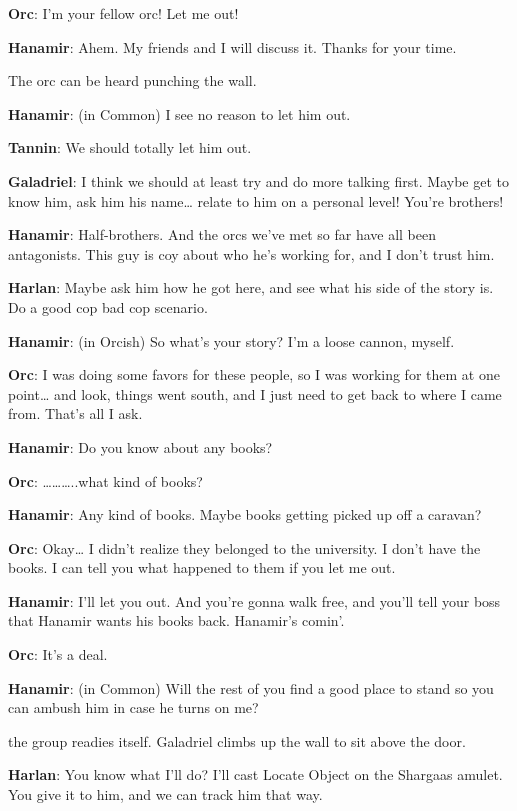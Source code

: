 \documentclass[smalldemyvopaper,11pt,twoside,onecolumn,openright,extrafontsizes]{memoir}
\begin{document}
\textbf{Orc}: I'm your fellow orc! Let me out!

\textbf{Hanamir}: Ahem. My friends and I will discuss it. Thanks for
your time.

The orc can be heard punching the wall.

\textbf{Hanamir}: (in Common) I see no reason to let him out.

\textbf{Tannin}: We should totally let him out.

\textbf{Galadriel}: I think we should at least try and do more talking
first. Maybe get to know him, ask him his name\ldots{} relate to him on
a personal level! You're brothers!

\textbf{Hanamir}: Half-brothers. And the orcs we've met so far have all
been antagonists. This guy is coy about who he's working for, and I
don't trust him.

\textbf{Harlan}: Maybe ask him how he got here, and see what his side of
the story is. Do a good cop bad cop scenario.

\textbf{Hanamir}: (in Orcish) So what's your story? I'm a loose cannon,
myself.

\textbf{Orc}: I was doing some favors for these people, so I was working
for them at one point\ldots{} and look, things went south, and I just
need to get back to where I came from. That's all I ask.

\textbf{Hanamir}: Do you know about any books?

\textbf{Orc}: \ldots\ldots\ldots..what kind of books?

\textbf{Hanamir}: Any kind of books. Maybe books getting picked up off a
caravan?

\textbf{Orc}: Okay\ldots{} I didn't realize they belonged to the
university. I don't have the books. I can tell you what happened to them
if you let me out.

\textbf{Hanamir}: I'll let you out. And you're gonna walk free, and
you'll tell your boss that Hanamir wants his books back. Hanamir's
comin'.

\textbf{Orc}: It's a deal.

\textbf{Hanamir}: (in Common) Will the rest of you find a good place to
stand so you can ambush him in case he turns on me?

the group readies itself. Galadriel climbs up the wall to sit above the
door.

\textbf{Harlan}: You know what I'll do? I'll cast Locate Object on the
Shargaas amulet. You give it to him, and we can track him that way.
\end{document}
